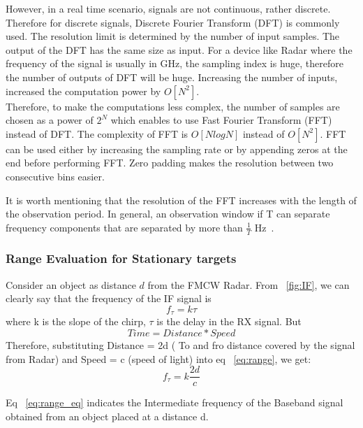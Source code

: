However, in a real time scenario, signals are not continuous, rather discrete. Therefore for discrete signals, Discrete Fourier Transform (DFT) is commonly used. The resolution limit is determined by the number of input samples.
The output of the DFT has the same size as input. For a device like Radar where the frequency of the signal is usually in GHz, the sampling index is huge, therefore the number of outputs of DFT will be huge. Increasing the number of inputs, increased the computation power by $O[N^2]$.
\\

Therefore, to make the computations less complex, the number of samples are chosen as a power of $2^N$ which enables to use Fast Fourier Transform (FFT) instead of DFT. The complexity of FFT is $O[NlogN]$ instead of $O[N^2]$. FFT can be used either by increasing the sampling rate or by appending zeros at the end before performing FFT. Zero padding makes the resolution between two consecutive bins easier.

It is worth mentioning that the resolution of the FFT increases with the length of the observation period. In general, an observation window if T can separate frequency components that are separated by more than $\frac{1}{T}$ Hz~\cite{rao_2017}.


\subsubsection{Range Evaluation for Stationary targets}\label{sec:rangeEval}

Consider an object as distance $d$ from the FMCW Radar. From ~\ref{fig:IF}, we can clearly say that the frequency of the IF signal is 
\begin{equation}\label{eq:range}
    f_{\tau}= k\tau
\end{equation}
where k is the slope of the chirp, $\tau$ is the delay in the RX signal.
But 
\begin{equation}
    Time = Distance*Speed
\end{equation}
Therefore, substituting Distance = 2d ( To and fro distance covered by the signal from Radar) and Speed = c (speed of light) into eq ~\ref{eq:range}, we get:
\begin{equation}\label{eq:range_eq}
f_{\tau}= k\frac{2d}{c}   
\end{equation}

Eq ~\ref{eq:range_eq} indicates the Intermediate frequency of the Baseband signal obtained from an object placed at a distance d.
\\


